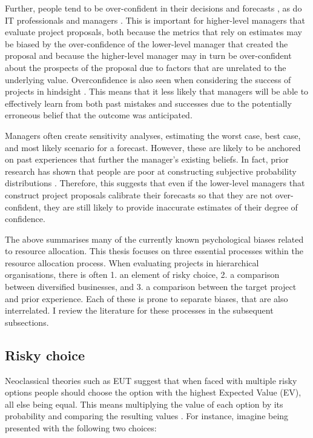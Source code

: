 \documentclass[a4paper, nobind, dvipsnames]{templates/ociamthesis}
\theoremstyle{definition}
\theoremstyle{definition}
\theoremstyle{definition}
\theoremstyle{definition}
\theoremstyle{remark}
\begin{document}
Further, people tend to be over-confident in their decisions and forecasts
\autocite{langer1975,mannes2013,soll2004,puri2007}, as do IT professionals
\autocite{mckenzie2008} and managers \autocite{lovallo2003,kahneman1993,baroneadesi2013}.
This is important for higher-level managers that evaluate project proposals,
both because the metrics that rely on estimates may be biased by the
over-confidence of the lower-level manager that created the proposal and because
the higher-level manager may in turn be over-confident about the prospects of
the proposal due to factors that are unrelated to the underlying value.
Overconfidence is also seen when considering the success of projects in
hindsight \autocite{bukszar1988,christensenszalanski1991}. This means that it less
likely that managers will be able to effectively learn from both past mistakes
and successes due to the potentially erroneous belief that the outcome was
anticipated.

Managers often create sensitivity analyses, estimating the worst case, best
case, and most likely scenario for a forecast. However, these are likely to be
anchored on past experiences that further the manager's existing beliefs. In
fact, prior research has shown that people are poor at constructing subjective
probability distributions \autocites[e.g.,][]{alpert1982,schaefer1973,staelvonholstein1971,tversky1974}. Therefore, this suggests that even if the
lower-level managers that construct project proposals calibrate their forecasts
so that they are not over-confident, they are still likely to provide inaccurate
estimates of their degree of confidence.

The above summarises many of the currently known psychological biases related to
resource allocation. This thesis focuses on three essential processes within the
resource allocation process. When evaluating projects in hierarchical
organisations, there is often 1. an element of risky choice, 2. a comparison
between diversified businesses, and 3. a comparison between the target project
and prior experience. Each of these is prone to separate biases, that are also
interrelated. I review the literature for these processes in the subsequent
subsections.

\subsection{Risky choice}

Neoclassical theories such as EUT suggest that when faced with multiple risky
options people should choose the option with the highest Expected Value (EV),
all else being equal. This means multiplying the value of each option by its
probability and comparing the resulting values \autocite[first documented in][]{pascal1999}. For instance, imagine being presented with the following two
choices:
\end{document}
